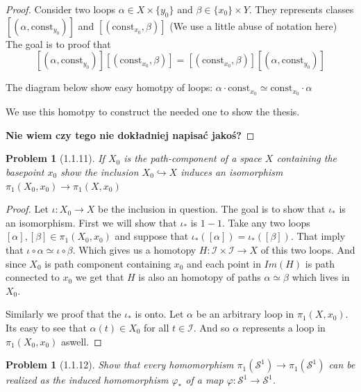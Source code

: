\documentclass[11pt, a4paper, final]{amsart}
\newcommand\todo[1]{\textbf{\textcolor{redd}{#1}}}
\newcommand{\unit}{\mathcal{I}}
\newcommand{\sphere}{\mathcal{S}}
\numberwithin{theorem}{section}
\newtheorem{problem}[theorem]{Problem}
\theoremstyle{definition}
\theoremstyle{remark}
\begin{document}
\begin{proof}
    Consider two loops $\alpha  \in X \times \{y_0\}$ and $\beta \in \{x_0\} \times Y$. They represents
    classes $[(\alpha, \text{const}_{y_0})]$ and $[(\text{const}_{x_0}, \beta)]$ (We use a little abuse of notation here) 
    The goal is to proof that 
    $$[(\alpha, \text{const}_{y_0})] [(\text{const}_{x_0}, \beta)] = [(\text{const}_{x_0}, \beta)][(\alpha, \text{const}_{y_0})] $$
    
    The diagram below show easy homotpy of loops: $\alpha \cdot \text{const}_{x_0} \simeq \text{const}_{x_0} \cdot \alpha$
    \begin{center}
        
    \end{center}

    We use this homotpy to construct the needed one to show the thesis. 

    \todo{Nie wiem czy tego nie dokładniej napisać jakoś?}
\end{proof}

\begin{problem}[1.1.11]\label{problem: 1.1.11}
    If $X_0$ is the path-component of a space $X$ containing the basepoint $x_0$ show the inclusion $X_0 \hookrightarrow X$ induces an
    isomorphism $\pi_1(X_0, x_0) \to \pi_1(X,x_0)$
\end{problem}

\begin{proof}
    Let $\iota : X_0 \to X$ be the inclusion in question. The goal is to show that $\iota_{*}$ is an isomorphism. 
    First we will show that $\iota_{*}$ is $1-1$. Take any two loops $[\alpha],[\beta] \in \pi_1(X_0,x_0)$
    and suppose that $\iota_{*}([\alpha]) = \iota_{*}([\beta])$. That imply that $\iota \circ \alpha \simeq \iota \circ \beta$. 
    Which gives us a homotopy $H : \unit \times \unit \to X$ of this two loops. And since $X_0$ is path component containing $x_0$ and each point in $Im(H)$ is path connected
    to $x_0$ we get that $H$ is also an homotopy of paths $\alpha \simeq \beta$ which lives in $X_0$.
    
    Similarly we proof that the $\iota_{*}$ is onto. Let $\alpha$ be an arbitrary loop in $\pi_1(X,x_0)$. Its easy to see that $\alpha(t) \in X_0$
    for all $t \in \unit$. And so $\alpha$ represents a loop in $\pi_1(X_0, x_0)$ aswell.
\end{proof}

\begin{problem}[1.1.12]\label{problem: 1.1.12}
    Show that every homomorphism $\pi_1(\sphere^1) \to \pi_1(\sphere^1)$ can be realized as the induced homomorphism
    $\varphi_{*}$ of a map $\varphi:\sphere^1 \to \sphere^1$.
\end{problem}
\end{document}
